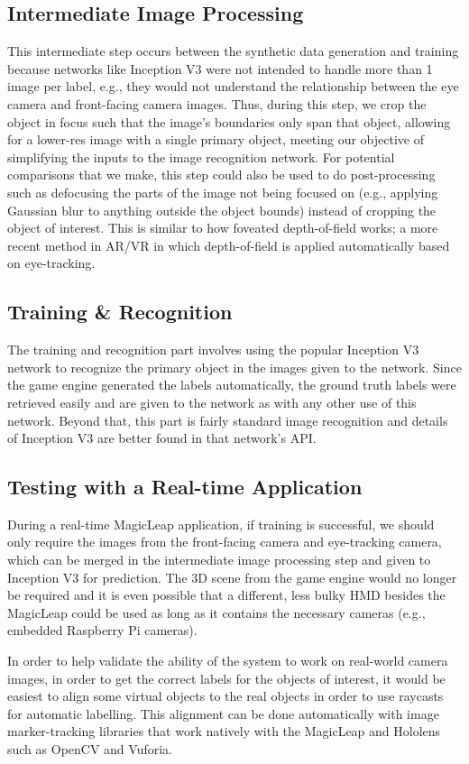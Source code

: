 \subsection{Intermediate Image Processing}

This intermediate step occurs between the synthetic data generation and training
because networks like Inception V3 were not intended to handle more than 1 image
per label, e.g., they would not understand the relationship between the eye
camera and front-facing camera images. Thus, during this step, we crop the
object in focus such that the image's boundaries only span that object, allowing
for a lower-res image with a single primary object, meeting our objective of
simplifying the inputs to the image recognition network. For potential
comparisons that we make, this step could also be used to do post-processing
such as defocusing the parts of the image not being focused on (e.g., applying
Gaussian blur to anything outside the object bounds) instead of cropping the
object of interest. This is similar to how foveated depth-of-field works; a more
recent method in AR/VR in which depth-of-field is applied automatically based on
eye-tracking.

\subsection{Training \& Recognition}

The training and recognition part involves using the popular Inception V3
network to recognize the primary object in the images given to the network.
Since the game engine generated the labels automatically, the ground truth
labels were retrieved easily and are given to the network as with any other use
of this network. Beyond that, this part is fairly standard image recognition and
details of Inception V3 are better found in that network's API\@.

\subsection{Testing with a Real-time Application}

During a real-time MagicLeap application, if training is successful, we should
only require the images from the front-facing camera and eye-tracking camera,
which can be merged in the intermediate image processing step and given to
Inception V3 for prediction. The 3D scene from the game engine would no longer
be required and it is even possible that a different, less bulky HMD besides the
MagicLeap could be used as long as it contains the necessary cameras (e.g.,
embedded Raspberry Pi cameras).

In order to help validate the ability of the system to work on real-world camera
images, in order to get the correct labels for the objects of interest, it would
be easiest to align some virtual objects to the real objects in order to use
raycasts for automatic labelling. This alignment can be done automatically with
image marker-tracking libraries that work natively with the MagicLeap and
Hololens such as OpenCV and Vuforia.
